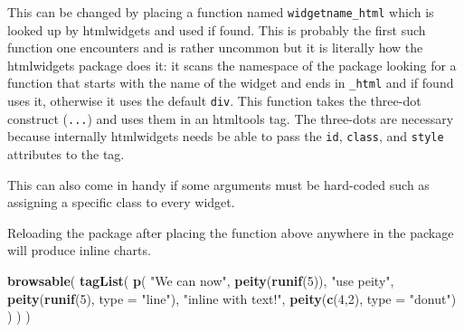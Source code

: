 \documentclass[
]{krantz}
\makeatletter
\newenvironment{Shaded}{\begin{snugshade}}{\end{snugshade}}
\newcommand{\ControlFlowTok}[1]{\textcolor[rgb]{0.27,0.27,0.27}{\textbf{#1}}}
\newcommand{\DataTypeTok}[1]{\textcolor[rgb]{0.27,0.27,0.27}{#1}}
\newcommand{\DecValTok}[1]{\textcolor[rgb]{0.06,0.06,0.06}{#1}}
\newcommand{\KeywordTok}[1]{\textcolor[rgb]{0.27,0.27,0.27}{\textbf{#1}}}
\newcommand{\NormalTok}[1]{#1}
\newcommand{\OperatorTok}[1]{\textcolor[rgb]{0.43,0.43,0.43}{\textbf{#1}}}
\newcommand{\StringTok}[1]{\textcolor[rgb]{0.5,0.5,0.5}{#1}}
\newenvironment{kframe}{%
\medskip{}
\setlength{\fboxsep}{.8em}
 \def\at@end@of@kframe{}%
 \ifinner\ifhmode%
  \def\at@end@of@kframe{\end{minipage}}%
  \begin{minipage}{\columnwidth}%
 \fi\fi%
 \def\FrameCommand##1{\hskip\@totalleftmargin \hskip-\fboxsep
 \colorbox{shadecolor}{##1}\hskip-\fboxsep
     \hskip-\linewidth \hskip-\@totalleftmargin \hskip\columnwidth}%
 \MakeFramed {\advance\hsize-\width
   \@totalleftmargin\z@ \linewidth\hsize
   \@setminipage}}%
 {\par\unskip\endMakeFramed%
 \at@end@of@kframe}
\renewenvironment{Shaded}{\begin{kframe}}{\end{kframe}}
\makeatother
\begin{document}
This can be changed by placing a function named \texttt{widgetname\_html} which is looked up by htmlwidgets and used if found. This is probably the first such function one encounters and is rather uncommon but it is literally how the htmlwidgets package does it: it scans the namespace of the package looking for a function that starts with the name of the widget and ends in \texttt{\_html} and if found uses it, otherwise it uses the default \texttt{div}. This function takes the three-dot construct (\texttt{...}) and uses them in an htmltools tag. The three-dots are necessary because internally htmlwidgets needs be able to pass the \texttt{id}, \texttt{class}, and \texttt{style} attributes to the tag.

\begin{Shaded}
\end{Shaded}

This can also come in handy if some arguments must be hard-coded such as assigning a specific class to every widget.

\begin{Shaded}
\end{Shaded}

Reloading the package after placing the function above anywhere in the package will produce inline charts.

\begin{Shaded}
\begin{Highlighting}[]
\KeywordTok{browsable}\NormalTok{(}
  \KeywordTok{tagList}\NormalTok{(}
    \KeywordTok{p}\NormalTok{(}
      \StringTok{"We can now"}\NormalTok{, }\KeywordTok{peity}\NormalTok{(}\KeywordTok{runif}\NormalTok{(}\DecValTok{5}\NormalTok{)),}
      \StringTok{"use peity"}\NormalTok{, }\KeywordTok{peity}\NormalTok{(}\KeywordTok{runif}\NormalTok{(}\DecValTok{5}\NormalTok{), }\DataTypeTok{type =} \StringTok{"line"}\NormalTok{),}
      \StringTok{"inline with text!"}\NormalTok{,}
      \KeywordTok{peity}\NormalTok{(}\KeywordTok{c}\NormalTok{(}\DecValTok{4}\NormalTok{,}\DecValTok{2}\NormalTok{), }\DataTypeTok{type =} \StringTok{"donut"}\NormalTok{)}
\NormalTok{    )}
\NormalTok{  )}
\NormalTok{)}
\end{Highlighting}
\end{Shaded}
\end{document}
